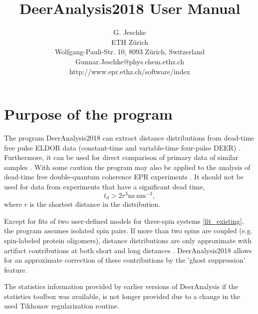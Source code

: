 \documentclass{article}
\begin{document}
\title{DeerAnalysis2018 User Manual}

\author{G. Jeschke \\ ETH Z\"urich \\ Wolfgang-Pauli-Str. 10, 8093 Z\"urich, Switzerland \\ Gunnar.Jeschke@phys.chem.ethz.ch \\ http://www.epr.ethz.ch/software/index}

\maketitle 

\section{Purpose of the program}
\label{purpose}

The program DeerAnalysis2018 can extract distance distributions from dead-time free pulse ELDOR data (constant-time and variable-time four-pulse DEER) \cite{pannier2000,jeschke2004b}. Furthermore, it can be used for direct comparison of primary data of similar samples \cite{jeschke2004a}. With some caution \cite{jeschke2001} the program may also be applied to the analysis of dead-time free double-quantum coherence EPR experiments \cite{borbat1999}. It should not be used for data from experiments that have a significant dead time,
%
\begin{equation}
	t_{d}> 2 r^{3} \mathrm{ns} \ \mathrm{nm}^{-3} ,
\end{equation}
where $r$ is the shortest distance in the distribution.

Except for fits of two user-defined models for three-spin systems \ref{fit_existing}, the program assumes isolated spin pairs. If more than two spins are coupled (e.g. spin-labeled protein oligomers), distance distributions are only approximate with artifact contributions at both short and long distances \cite{jeschke2009}. DeerAnalysis2018 allows for an approximate correction of these contributions by the 'ghost suppression' feature.

The statistics information provided by earlier versions of DeerAnalysis if the statistics toolbox was available, is not longer provided due to a change in the used Tikhonov regularization routine.
\end{document}
